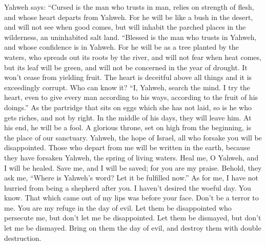  Yahweh says: ``Cursed is the man who trusts in man, relies
on strength of flesh, and whose heart departs from Yahweh. 
For he will be like a bush in the desert, and will not see when good
comes, but will inhabit the parched places in the wilderness, an
uninhabited salt land.  ``Blessed is the man who trusts in
Yahweh, and whose confidence is in Yahweh.  For he will be
as a tree planted by the waters, who spreads out its roots by the river,
and will not fear when heat comes, but its leaf will be green, and will
not be concerned in the year of drought. It won't cease from yielding
fruit.  The heart is deceitful above all things and it is
exceedingly corrupt. Who can know it?  ``I, Yahweh, search
the mind. I try the heart, even to give every man according to his ways,
according to the fruit of his doings.''  As the partridge
that sits on eggs which she has not laid, so is he who gets riches, and
not by right. In the middle of his days, they will leave him. At his
end, he will be a fool.  A glorious throne, set on high
from the beginning, is the place of our sanctuary.  Yahweh,
the hope of Israel, all who forsake you will be disappointed. Those who
depart from me will be written in the earth, because they have forsaken
Yahweh, the spring of living waters.  Heal me, O Yahweh,
and I will be healed. Save me, and I will be saved; for you are my
praise.  Behold, they ask me, ``Where is Yahweh's word? Let
it be fulfilled now.''  As for me, I have not hurried from
being a shepherd after you. I haven't desired the woeful day. You know.
That which came out of my lips was before your face.  Don't
be a terror to me. You are my refuge in the day of evil. 
Let them be disappointed who persecute me, but don't let me be
disappointed. Let them be dismayed, but don't let me be dismayed. Bring
on them the day of evil, and destroy them with double destruction.

